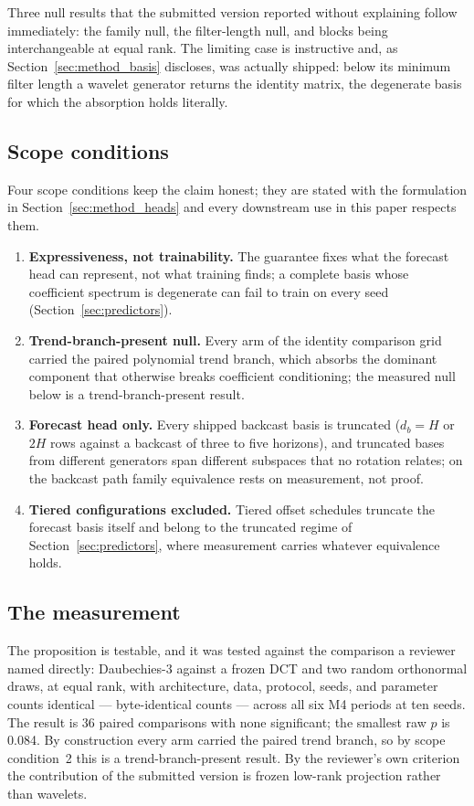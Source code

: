 Three null results that the submitted version reported without explaining
follow immediately: the family null, the filter-length null, and blocks
being interchangeable at equal rank. The limiting case is instructive and,
as Section~\ref{sec:method_basis} discloses, was actually shipped: below
its minimum filter length a wavelet generator returns the identity matrix,
the degenerate basis for which the absorption holds literally.

\subsection{Scope conditions}
\label{sec:completeness:scope}

Four scope conditions keep the claim honest; they are stated with the
formulation in Section~\ref{sec:method_heads} and every downstream use in
this paper respects them.
\begin{enumerate}
\item \textbf{Expressiveness, not trainability.} The guarantee fixes what
the forecast head can represent, not what training finds; a complete
basis whose coefficient spectrum is degenerate can fail to train on every
seed (Section~\ref{sec:predictors}).
\item \textbf{Trend-branch-present null.} Every arm of the identity
comparison grid carried the paired polynomial trend branch, which absorbs
the dominant component that otherwise breaks coefficient conditioning;
the measured null below is a trend-branch-present result.
\item \textbf{Forecast head only.} Every shipped backcast basis is
truncated ($d_b = H$ or $2H$ rows against a backcast of three to five
horizons), and truncated bases from different generators span different
subspaces that no rotation relates; on the backcast path family
equivalence rests on measurement, not proof.
\item \textbf{Tiered configurations excluded.} Tiered offset schedules
truncate the forecast basis itself and belong to the truncated regime of
Section~\ref{sec:predictors}, where measurement carries whatever
equivalence holds.
\end{enumerate}
\subsection{The measurement}
\label{sec:completeness:measurement}

The proposition is testable, and it was tested against the comparison a
reviewer named directly: Daubechies-3 \citep{daubechies1992ten} against a
frozen DCT and two random orthonormal draws, at equal rank, with
architecture, data, protocol, seeds, and parameter counts identical ---
byte-identical counts --- across all six M4 periods at ten seeds. The
result is 36 paired comparisons with none significant; the smallest raw
$p$ is 0.084. By construction every arm carried the paired trend branch,
so by scope condition~2 this is a trend-branch-present result. By the
reviewer's own criterion the contribution of the submitted version is
frozen low-rank projection rather than wavelets.

